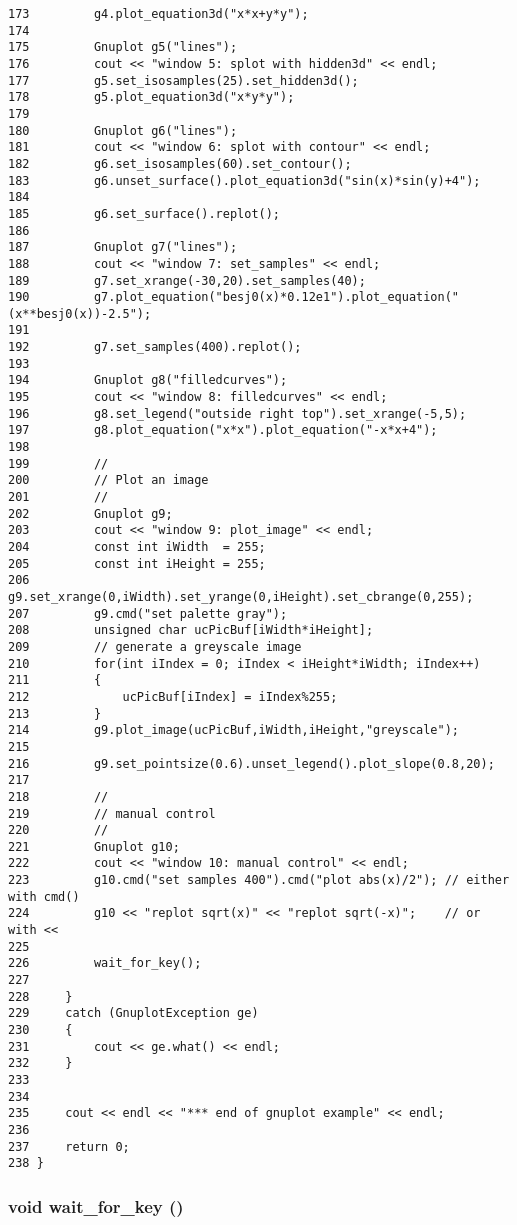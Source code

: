 \begin{Code}
\begin{verbatim}
173         g4.plot_equation3d("x*x+y*y");
174 
175         Gnuplot g5("lines");
176         cout << "window 5: splot with hidden3d" << endl;
177         g5.set_isosamples(25).set_hidden3d();
178         g5.plot_equation3d("x*y*y");
179 
180         Gnuplot g6("lines");
181         cout << "window 6: splot with contour" << endl;
182         g6.set_isosamples(60).set_contour();
183         g6.unset_surface().plot_equation3d("sin(x)*sin(y)+4");
184 
185         g6.set_surface().replot();
186 
187         Gnuplot g7("lines");
188         cout << "window 7: set_samples" << endl;
189         g7.set_xrange(-30,20).set_samples(40);
190         g7.plot_equation("besj0(x)*0.12e1").plot_equation("(x**besj0(x))-2.5");
191 
192         g7.set_samples(400).replot();
193 
194         Gnuplot g8("filledcurves");
195         cout << "window 8: filledcurves" << endl;
196         g8.set_legend("outside right top").set_xrange(-5,5);
197         g8.plot_equation("x*x").plot_equation("-x*x+4");
198 
199         //
200         // Plot an image
201         //
202         Gnuplot g9;
203         cout << "window 9: plot_image" << endl;
204         const int iWidth  = 255;
205         const int iHeight = 255;
206         g9.set_xrange(0,iWidth).set_yrange(0,iHeight).set_cbrange(0,255);
207         g9.cmd("set palette gray");
208         unsigned char ucPicBuf[iWidth*iHeight];
209         // generate a greyscale image
210         for(int iIndex = 0; iIndex < iHeight*iWidth; iIndex++)
211         {
212             ucPicBuf[iIndex] = iIndex%255;
213         }
214         g9.plot_image(ucPicBuf,iWidth,iHeight,"greyscale");
215 
216         g9.set_pointsize(0.6).unset_legend().plot_slope(0.8,20);
217 
218         //
219         // manual control
220         //
221         Gnuplot g10;
222         cout << "window 10: manual control" << endl;
223         g10.cmd("set samples 400").cmd("plot abs(x)/2"); // either with cmd()
224         g10 << "replot sqrt(x)" << "replot sqrt(-x)";    // or with <<
225 
226         wait_for_key();
227 
228     }
229     catch (GnuplotException ge)
230     {
231         cout << ge.what() << endl;
232     }
233 
234 
235     cout << endl << "*** end of gnuplot example" << endl;
236 
237     return 0;
238 }
\end{verbatim}
\end{Code}


\subsubsection[{wait\_\-for\_\-key}]{\setlength{\rightskip}{0pt plus 5cm}void wait\_\-for\_\-key ()}\label{d2/d80/example_8cc_621288a08ecc9633729935737256e831}




